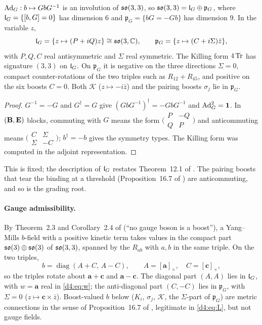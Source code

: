 \begin{proposition}
\label{d4:prop:lp}
$\operatorname{Ad}_G:b\mapsto GbG^{-1}$ is an involution of $\mathfrak{so}(3,3)$, so $\mathfrak{so}(3,3)=\mathfrak l_G\oplus\mathfrak p_G$, where $\mathfrak l_G=\{[b,G]=0\}$ has dimension $6$ and
$\mathfrak p_G=\{bG=-Gb\}$ has dimension $9$. In the variable $z$,
\[
\mathfrak l_G=\{z\mapsto(P+iQ)z\}\cong\mathfrak{so}(3,\mathbb{C}),\qquad \mathfrak p_G=\{z\mapsto(C+i\Sigma)\bar z\},
\]
with $P,Q,C$ real antisymmetric and $\Sigma$ real symmetric. The Killing form $4\operatorname{Tr}$ has signature $(3,3)$ on $\mathfrak l_G$. On $\mathfrak p_G$ it is
negative on the three directions $\Sigma=0$, compact counter-rotations of the two triples such as $R_{12}+R_{45}$, and positive on the
six boosts $C=0$. Both $\mathcal K$ ($z\mapsto-i\bar z$) and the pairing boosts $\sigma_j$ lie in $\mathfrak p_G$.
\end{proposition}

\begin{proof}
$G^{-1}=-G$ and $G^\dagger=G$ give $(GbG^{-1})^\dagger=-GbG^{-1}$ and $\operatorname{Ad}_G^2=\mathbf 1$. In $(\mathbf B,\mathbf E)$ blocks, commuting with $G$ means the form
$\bigl(\begin{smallmatrix}P&-Q\\Q&P\end{smallmatrix}\bigr)$ and anticommuting means $\bigl(\begin{smallmatrix}C&\Sigma\\\Sigma&-C\end{smallmatrix}\bigr)$;
$b^\dagger=-b$ gives the symmetry types. The Killing form was computed in the adjoint representation.
\end{proof}

This is fixed; the description of $\mathfrak l_G$ restates Theorem~12.1 of \cite{ES17}. The pairing boosts that tear the binding at a threshold
(Proposition~16.7 of \cite{ES17}) are anticommuting, and so is the grading root.

\paragraph{Gauge admissibility.} By Theorem~2.3 and Corollary~2.4 of \cite{ES17} (``no gauge boson is a boost''), a Yang--Mills $b$-field with
a positive kinetic term takes values in the compact part $\mathfrak{so}(3)\oplus\mathfrak{so}(3)$ of $\mathfrak{so}(3,3)$, spanned by the $R_{ab}$ with $a,b$ in the same
triple. On the two triples,
\begin{equation}
\label{d4:eq:compact}
b=\operatorname{diag}(A+C,\,A-C),\qquad A=[\mathbf a]_\times,\quad C=[\mathbf c]_\times,
\end{equation}
so the triples rotate about $\mathbf a+\mathbf c$ and $\mathbf a-\mathbf c$. The diagonal part $(A,A)$ lies in $\mathfrak l_G$, with $w=\mathbf a$ real
in \eqref{d4:eq:w}; the anti-diagonal part $(C,-C)$ lies in $\mathfrak p_G$, with $\Sigma=0$ ($z\mapsto\mathbf c\times\bar z$). Boost-valued $b$
below ($K_i$, $\sigma_j$, $\mathcal K$, the $\Sigma$-part of $\mathfrak p_G$) are metric connections in the sense of Proposition~16.7 of
\cite{ES17}, legitimate in \eqref{d4:eq:L}, but not gauge fields.

